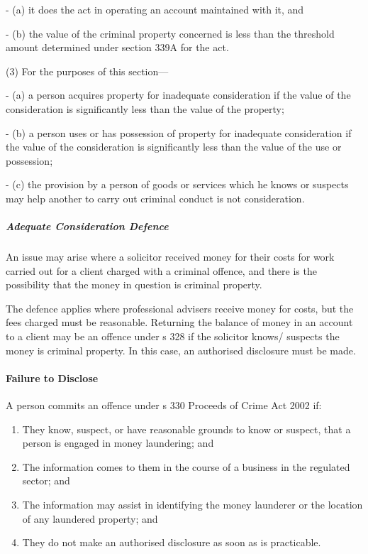 \documentclass[
]{article}
\newenvironment{Shaded}{}{}
\newcommand{\NormalTok}[1]{#1}
\providecommand{\tightlist}{%
  \setlength{\itemsep}{0pt}\setlength{\parskip}{0pt}}
\begin{document}
\begin{Shaded}
\begin{Highlighting}[]
\NormalTok{{-} (a) it does the act in operating an account maintained with it, and}

\NormalTok{{-} (b) the value of the criminal property concerned is less than the threshold amount determined under section 339A for the act.}

\NormalTok{(3) For the purposes of this section—}

\NormalTok{{-} (a) a person acquires property for inadequate consideration if the value of the consideration is significantly less than the value of the property;}

\NormalTok{{-} (b) a person uses or has possession of property for inadequate consideration if the value of the consideration is significantly less than the value of the use or possession;}

\NormalTok{{-} (c) the provision by a person of goods or services which he knows or suspects may help another to carry out criminal conduct is not consideration.}
\end{Highlighting}
\end{Shaded}

\hypertarget{adequate-consideration-defence}{%
\subparagraph{Adequate Consideration
Defence}\label{adequate-consideration-defence}}

An issue may arise where a solicitor received money for their costs for
work carried out for a client charged with a criminal offence, and there
is the possibility that the money in question is criminal property.

The defence applies where professional advisers receive money for costs,
but the fees charged must be reasonable. Returning the balance of money
in an account to a client may be an offence under s 328 if the solicitor
knows/ suspects the money is criminal property. In this case, an
authorised disclosure must be made.

\hypertarget{failure-to-disclose}{%
\paragraph{Failure to Disclose}\label{failure-to-disclose}}

A person commits an offence under s 330 Proceeds of Crime Act 2002 if:

\begin{enumerate}
\def\labelenumi{\arabic{enumi}.}
\tightlist
\item
  They know, suspect, or have reasonable grounds to know or suspect,
  that a person is engaged in money laundering; and
\item
  The information comes to them in the course of a business in the
  regulated sector; and
\item
  The information may assist in identifying the money launderer or the
  location of any laundered property; and
\item
  They do not make an authorised disclosure as soon as is practicable.
\end{enumerate}
\end{document}
